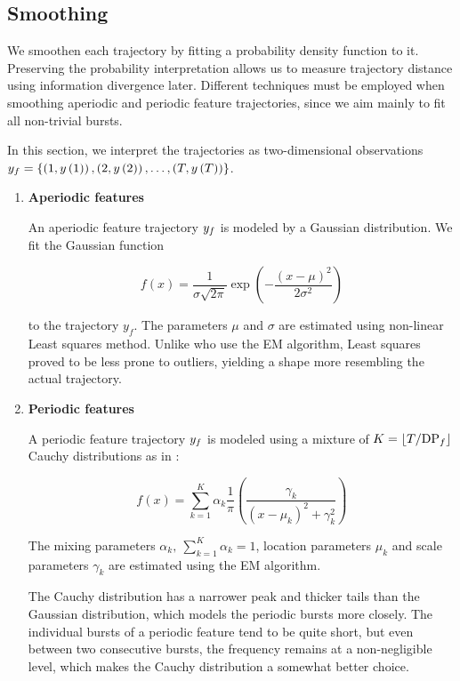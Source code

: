 \subsection{Smoothing}

We smoothen each trajectory by fitting a probability density function to it. Preserving the probability interpretation allows us to measure trajectory distance using information divergence later. Different techniques must be employed when smoothing aperiodic and periodic feature trajectories, since we aim mainly to fit all non-trivial bursts.

In this section, we interpret the trajectories as two-dimensional observations $y_{f} = \{ \left( 1, y \left(1 \right) \right), \left( 2, y \left(2 \right) \right), \dots, \left( T, y \left(T \right) \right) \}$.

\begin{enumerate}

\item \textbf{Aperiodic features}

An aperiodic feature trajectory $y_{f}$ is modeled by a Gaussian distribution. We fit the Gaussian function

\begin{equation*}
	f(x) = \frac{1}{\sigma \sqrt{2 \pi}} \exp(-\frac{\left( x - \mu \right)^{2}}{2 \sigma^{2}})
\end{equation*}

to the trajectory $y_{f}$. The parameters $\mu$ and $\sigma$ are estimated using non-linear Least squares method. Unlike \cite{event-detection} who use the EM algorithm, Least squares proved to be less prone to outliers, yielding a shape more resembling the actual trajectory.

\item \textbf{Periodic features}

A periodic feature trajectory $y_{f}$ is modeled using a mixture of $K = \lfloor T / \text{DP}_{f}\rfloor$ Cauchy distributions as in \cite{health-events}:

\begin{equation*}
	f(x) = \sum_{k = 1}^{K}{\alpha_{k} \frac{1}{\pi} \left( \frac{\gamma_{k}}{\left( x - \mu_{k} \right)^{2} + \gamma_{k}^{2}} \right)}
\end{equation*}

The mixing parameters $\alpha_{k},\ \sum_{k = 1}^{K}{\alpha_{k}} = 1$, location parameters $\mu_{k}$ and scale parameters $\gamma_{k}$ are estimated using the EM algorithm.

The Cauchy distribution has a narrower peak and thicker tails than the Gaussian distribution, which models the periodic bursts more closely. The individual bursts of a periodic feature tend to be quite short, but even between two consecutive bursts, the frequency remains at a non-negligible level, which makes the Cauchy distribution a somewhat better choice.

\end{enumerate}